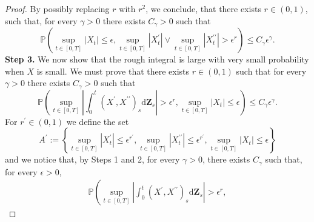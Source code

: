 \documentclass[11pt,a4paper]{article}
\theoremstyle{plain}
\begin{document}
\begin{proof}

    By possibly replacing $r$ with $r^2$, we conclude, that there exists $r\in (0,1)$, such that, for every $\gamma > 0$ there exists $C_{\gamma} > 0$ such that
    \begin{equation*}
        \mathbb{P}\left(
        \sup_{t\in[0,T]}|X_t| \le \epsilon,
        \sup_{t\in[0,T]}|X^{\prime}_t| \vee \sup_{t\in[0,T]}|X^{\prime\prime}_t| > \epsilon^r
        \right)
        \leq C_{\gamma}\epsilon^{\gamma}.
    \end{equation*} 
    \textbf{Step 3.} We now show that the rough integral is large with very small probability when $X$ is small. 
    We must prove that there exists $r\in (0,1)$ such that for every $\gamma > 0$ there exists $C_{\gamma} > 0$ such that
    \begin{equation}
    \label{eq: small rough integral when rough-ito is small}
    \mathbb{P}\left(\sup_{t\in[0,T]}|\int_0^t (X^{\prime},X^{\prime\prime})_s\mathrm{d}\mathbf{Z}_s| > \epsilon^r,
     \sup_{t\in[0,T]}|X_t| \le \epsilon
        \right)
        \leq C_{\gamma}\epsilon^{\gamma}.
    \end{equation} 
    For $r^{\prime} \in (0,1)$ we define the set
    \begin{equation*}
        A^{\prime} :=\left\{
        \sup_{t\in[0,T]}|X^{\prime}_t| \le \epsilon^{r^{\prime}},
                \sup_{t\in[0,T]}|X^{\prime\prime}_t| \le \epsilon^{r^{\prime}},
                \sup_{t\in[0,T]}|X_t| \le \epsilon
        \right\}
    \end{equation*}
    and we notice that, by Steps 1 and 2, for every $\gamma > 0$, there exists $C_{\gamma}$ such that, for every $\epsilon > 0$,
    \begin{multline*}
        \mathbb{P}\left(\sup_{t\in[0,T]}|\int_0^t (X^{\prime},X^{\prime\prime})_s\mathrm{d}\mathbf{Z}_s| > \epsilon^r,

\end{multline*}
\end{proof}
\end{document}
